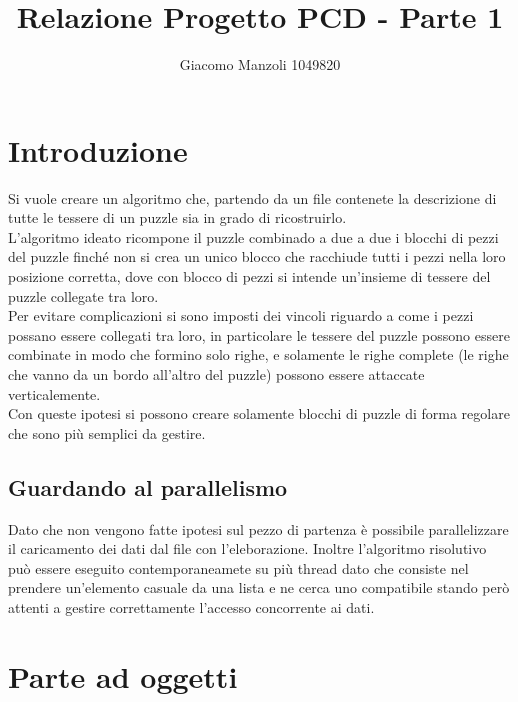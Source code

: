 \documentclass[a4paper, 11pt]{article}
\begin{document}
\title{Relazione Progetto PCD - Parte 1}
\author{Giacomo Manzoli 1049820}
\maketitle

\tableofcontents

\pagebreak

\section{Introduzione}

Si vuole creare un algoritmo che, partendo da un file contenete la descrizione di tutte le tessere di un puzzle sia in grado di ricostruirlo. \\
L'algoritmo ideato ricompone il puzzle combinado a due a due i blocchi di pezzi del puzzle finché non si crea un unico blocco che racchiude tutti i pezzi nella loro posizione corretta, dove con blocco di pezzi si intende un'insieme di tessere del puzzle collegate tra loro.\\
Per evitare complicazioni si sono imposti dei vincoli riguardo a come i pezzi possano essere collegati tra loro, in particolare le tessere del puzzle possono essere combinate in modo che formino solo righe, e solamente le righe complete (le righe che vanno da un bordo all'altro del puzzle) possono essere attaccate verticalemente.\\
Con queste ipotesi si possono creare solamente blocchi di puzzle di forma regolare che sono più semplici da gestire.

\subsection{Guardando al parallelismo}
Dato che non vengono fatte ipotesi sul pezzo di partenza è possibile parallelizzare il caricamento dei dati dal file con l’eleborazione.
Inoltre l’algoritmo risolutivo può essere eseguito contemporaneamete su più thread dato che consiste nel prendere un’elemento casuale da una lista e ne cerca uno compatibile stando però attenti a gestire correttamente l’accesso concorrente ai dati.

\section{Parte ad oggetti}
\end{document}
